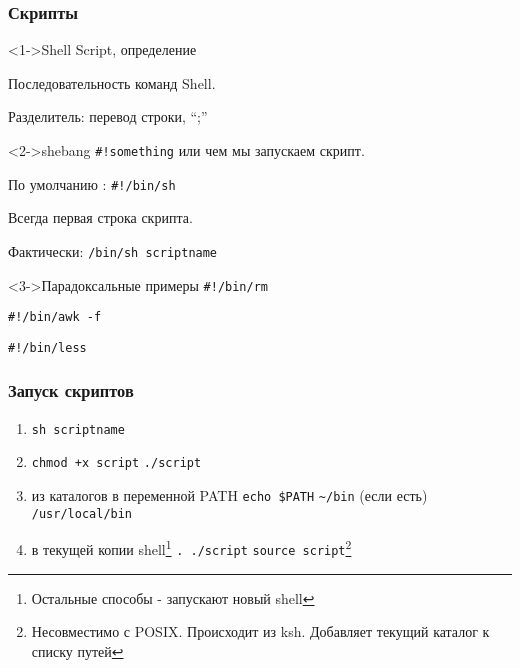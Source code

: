 \begin{frame}[fragile]
  \frametitle{Скрипты}
 
  \begin{block}<1->{Shell Script, определение}  

    Последовательность команд Shell.

    Разделитель: перевод строки, ``;''
  \end{block}

  \begin{block}<2->{shebang}
    \verb+#!something+ или чем мы запускаем скрипт. 
    
    По умолчанию : \verb+#!/bin/sh+
  
    Всегда первая строка скрипта.

    Фактически: \verb+/bin/sh scriptname+
  \end{block}

  \begin{block}<3->{Парадоксальные примеры}
    \verb+#!/bin/rm+

    \verb+#!/bin/awk -f+

    \verb+#!/bin/less+
  \end{block}

\end{frame}

\begin{frame}[fragile]
  \frametitle{Запуск скриптов}
  \begin{enumerate} 
    \item \verb+sh scriptname+
    \item \verb-chmod +x script- \newline \verb+./script+
    \item из каталогов в переменной PATH 
      \newline \verb+echo $PATH+
      \newline \verb+~/bin+ (если есть)
      \newline \verb+/usr/local/bin+
    \item в текущей копии shell\footnote{ Остальные способы - запускают новый shell}
      \newline \verb+. ./script+
      \newline \verb+source script+\footnote{ Несовместимо с POSIX. Происходит из ksh. Добавляет текущий каталог к списку путей}
  \end{enumerate}
\end{frame}

